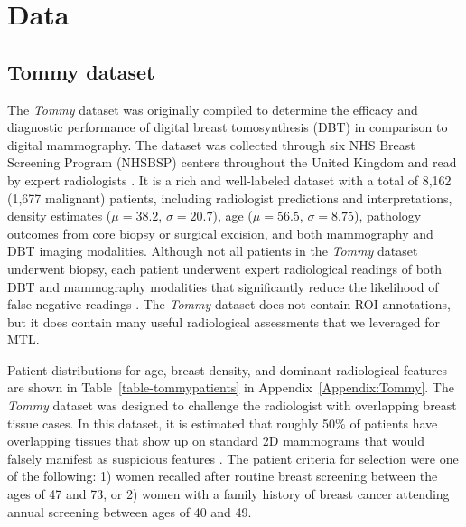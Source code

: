 \documentclass[journal]{IEEEtran}
\begin{document}

\section{Data}

\subsection{Tommy dataset}

The \textit{Tommy} dataset was originally compiled to determine the efficacy and diagnostic performance of digital breast tomosynthesis (DBT) in comparison to digital mammography.  The dataset was collected through six NHS Breast Screening Program (NHSBSP) centers throughout the United Kingdom and read by expert radiologists \cite{tommy-2015}.  It is a rich and well-labeled dataset with a total of 8,162 (1,677 malignant) patients, including radiologist predictions and interpretations, density estimates ($\mu = 38.2$, $\sigma=20.7$), age ($\mu = 56.5$, $\sigma=8.75$), pathology outcomes from core biopsy or surgical excision, and both mammography and DBT imaging modalities.  Although not all patients in the \textit{Tommy} dataset underwent biopsy, each patient underwent expert radiological readings of both DBT and mammography modalities that significantly reduce the likelihood of false negative readings \cite{tommy-2015}.  The \textit{Tommy} dataset does not contain ROI annotations, but it does contain many useful radiological assessments that we leveraged for MTL.  

Patient distributions for age, breast density, and dominant radiological features are shown in Table~\ref{table-tommypatients} in Appendix~\ref{Appendix:Tommy}. The \textit{Tommy} dataset was designed to challenge the radiologist with overlapping breast tissue cases.  In this dataset, it is estimated that roughly 50\% of patients have overlapping tissues that show up on standard 2D mammograms that would falsely manifest as suspicious features \cite{tommy-2015}.  
The patient criteria for selection were one of the following: 1) women recalled after routine breast screening between the ages of 47 and 73, or 2) women with a family history of breast cancer attending annual screening between ages of 40 and 49.
\end{document}
